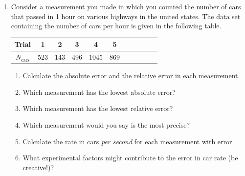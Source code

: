 \begin{enumerate}
  \item Consider a measurement you made in which you counted the number of cars that passed in 1 hour on various highways in the united states. The data set containing the number of cars per hour is given in the following table.
  \begin{center}
    \begin{tabular}{|c | c | c | c | c | c | c | c | c | c | c|}
      \hline
      Trial&1&2&3&4&5 \\ \hline
      $N_{\text{cars}}$&523&143&496&1045&869 \\
      \hline
    \end{tabular}
  \end{center}
  \begin{enumerate}
    \item Calculate the absolute error and the relative error in each measurement.
    \item Which measurement has the lowest absolute error?
    \item Which measurement has the lowest relative error?
    \item Which measurement would you say is the most precise?
    \item Calculate the rate in cars {\it{per second}} for each measurement with error.
    \item What experimental factors might contribute to the error in car rate (be creative!)?
  \end{enumerate}
\end{enumerate}
